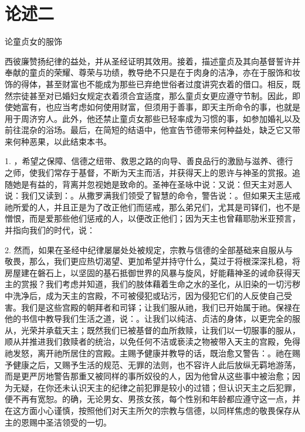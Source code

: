 
\section{论述二}

论童贞女的服饰\par

西彼廉赞扬纪律的益处，并从圣经证明其效用。接着，描述童贞及其向基督誓许并奉献的童贞的荣耀、尊荣与功绩，教导绝不只是在于肉身的洁净，亦在于服饰和妆饰的得体，甚至财富也不能成为那些已弃绝世俗者过度讲究衣着的借口。相反，既然宗徒甚至对已婚妇女规定衣着须合宜适度，那么童贞女更应遵守节制。因此，即使她富有，也应当考虑如何使用财富，但须用于善事，即天主所命令的事，也就是用于周济穷人。此外，他还禁止童贞女那些已轻率成为习惯的事，如参加婚礼以及前往混杂的浴场。最后，在简短的结语中，他宣告节德带来何种益处，缺乏它又带来何种恶果，以此结束本书。\par

1. ，希望之保障、信德之纽带、救恩之路的向导、善良品行的激励与滋养、德行之师，使我们常存于基督，不断为天主而活，并获得天上的恩许与神圣的赏报。追随她是有益的，背离并忽视她是致命的。圣神在圣咏中说：又说：但天主对恶人说：我们又读到：。从撒罗满我们领受了智慧的命令，警告说：。但如果天主惩戒祂所爱的人，并且正是为了改正他们而惩戒，那么弟兄们，尤其是司铎们，也不是憎恨，而是爱那些他们惩戒的人，以便改正他们；因为天主也曾藉耶肋米亚预言，并指向我们的时代，说：\par

2. 然而，如果在圣经中纪律屡屡处处被规定，宗教与信德的全部基础来自服从与敬畏，那么，我们更应热切渴望、更加希望并持守什么，莫过于将根深深扎稳，将房屋建在磐石上，以坚固的基石抵御世界的风暴与旋风，好能藉神圣的诫命获得天主的赏报？我们考虑并知道，我们的肢体藉着生命之水的圣化，从旧染的一切污秽中洗净后，成为天主的宫殿，不可被侵犯或玷污，因为侵犯它们的人反使自己受害。我们是这些宫殿的朝拜者和司铎；让我们服从祂，我们已开始属于祂。保禄在他的书信中教导我们生活之道，说：。让我们以纯洁、贞洁的身体，以更完全的服从，光荣并承载天主；既然我们已被基督的血所救赎，让我们以一切服事的服从，顺从并推进我们救赎者的统治，以免任何不洁或亵渎之物被带入天主的宫殿，免得祂发怒，离开祂所居住的宫殿。主赐予健康并教导的话，既治愈又警告：。祂在赐予健康之后，又赐予生活的规范、无罪的法则，也不容许人此后放纵无羁地游荡，而是更严厉地警告那重又被同样的事所奴役的人，因为他曾从这些事中被治愈；因为无疑，在你还未认识天主的纪律之前犯罪是较小的过错；但认识天主之后犯罪，便不再有宽恕。的确，无论男女、男孩女孩，每个性别和年龄都应遵守这一点，并在这方面小心谨慎，按照他们对天主所欠的宗教与信德，以同样焦虑的敬畏保存从主的恩赐中圣洁领受的一切。\par


